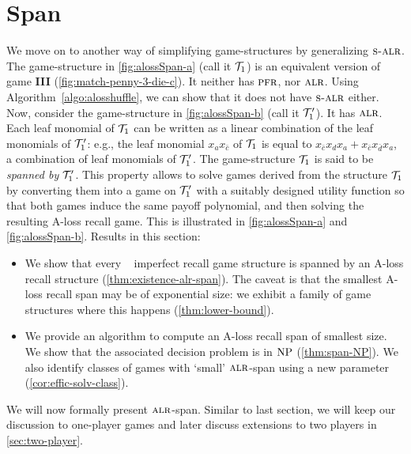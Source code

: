 
\section{Span}
\label{sec:span}



We move on to another way of simplifying game-structures by generalizing $\textsc{s-alr}$. The
game-structure in \cref{fig:alossSpan-a} (call it $\mathcal{T}_1$) is an equivalent version of game \textbf{III} (\cref{fig:match-penny-3-die-c}). It neither has
$\textsc{pfr}$, nor $\textsc{alr}$. Using
Algorithm~\ref{algo:alosshuffle}, we can show that it does not have $\textsc{s-alr}$ either. Now, consider the game-structure in
\cref{fig:alossSpan-b} (call it
$\mathcal{T}'_1$). It has $\textsc{alr}$. Each leaf monomial of $\mathcal{T}_1$ can be written as 
a linear combination of the leaf monomials of $\mathcal{T}'_1$: e.g.,
the leaf monomial $x_ax_{\bar{c}}$ of $\mathcal{T}_1$ is equal to
$x_{\bar{c}}x_d x_a + x_{\bar{c}} x_{\bar{d}} x_a$, a combination of leaf
monomials of $\mathcal{T}'_1$.  The game-structure $\mathcal{T}_1$ is said to be
\emph{spanned by} $\mathcal{T}'_1$. This property allows to solve games
derived from the structure $\mathcal{T}_1$ by converting them into a game on
$\mathcal{T}'_1$ with a suitably designed utility function so that both games
induce the same payoff polynomial, and then solving the resulting
A-loss recall game. This is 
illustrated in \cref{fig:alossSpan-a} and \cref{fig:alossSpan-b}. Results in this section:
\begin{itemize}\item We show that every \nam~ imperfect recall game structure is
  spanned by an A-loss recall structure
  (\cref{thm:existence-alr-span}).  The caveat is that the
  smallest A-loss recall span may be of exponential size: we exhibit a
  family of game structures where this happens
  (\cref{thm:lower-bound}).

\item We provide an algorithm to compute an A-loss recall span of
  smallest size. We show that the associated decision problem is in $\operatorname{NP}$ (\cref{thm:span-NP}). We also identify classes of games with `small' $\textsc{alr}$-span using a new parameter (\cref{cor:effic-solv-class}). 
\end{itemize}


We will now formally present $\textsc{alr}$-span.
Similar to last section, we will keep our discussion to one-player
games and later discuss extensions to two players in \cref{sec:two-player}.


